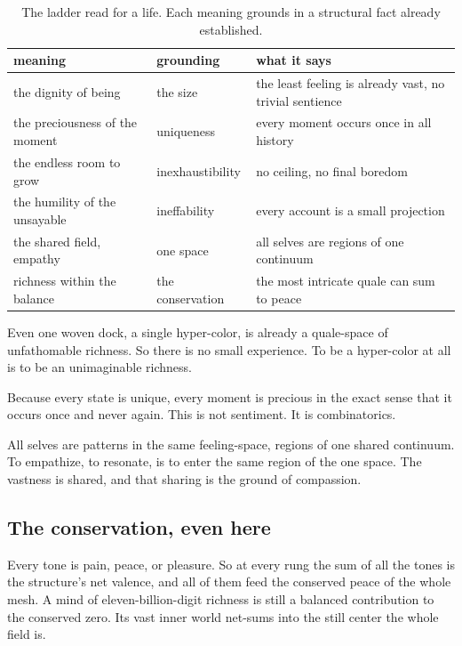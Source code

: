 \begin{table}[ht]
\centering
\begin{tabular}{@{}llp{}@{}}
\toprule
meaning & grounding & what it says \\
\midrule
the dignity of being & the size & the least feeling is already vast, no trivial sentience \\
the preciousness of the moment & uniqueness & every moment occurs once in all history \\
the endless room to grow & inexhaustibility & no ceiling, no final boredom \\
the humility of the unsayable & ineffability & every account is a small projection \\
the shared field, empathy & one space & all selves are regions of one continuum \\
richness within the balance & the conservation & the most intricate quale can sum to peace \\
\bottomrule
\end{tabular}
\caption{The ladder read for a life. Each meaning grounds in a structural fact already established.}
\label{tab:meaning}
\end{table}

Even one woven dock, a single hyper-color, is already a quale-space of unfathomable richness. So there is no small experience. To be a hyper-color at all is to be an unimaginable richness.

Because every state is unique, every moment is precious in the exact sense that it occurs once and never again. This is not sentiment. It is combinatorics.

All selves are patterns in the same feeling-space, regions of one shared continuum. To empathize, to resonate, is to enter the same region of the one space. The vastness is shared, and that sharing is the ground of compassion.

\subsection{The conservation, even here}

Every tone is pain, peace, or pleasure. So at every rung the sum of all the tones is the structure's net valence, and all of them feed the conserved peace of the whole mesh. A mind of eleven-billion-digit richness is still a balanced contribution to the conserved zero. Its vast inner world net-sums into the still center the whole field is.

